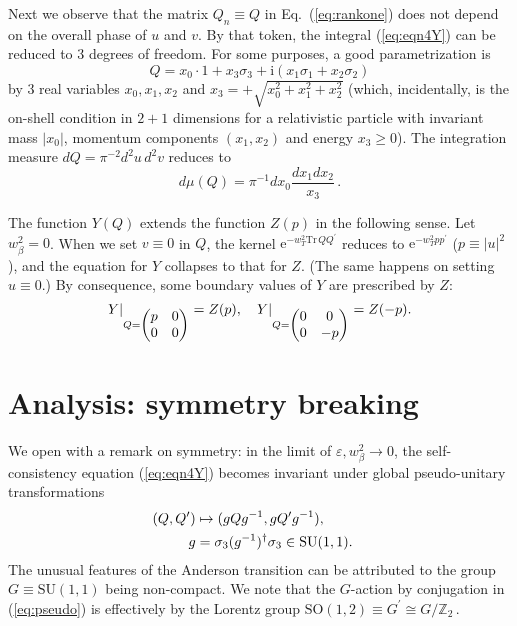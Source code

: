 \documentclass[aps,prl,twocolumn,letterpaper,superscriptaddress]{revtex4-2}
\begin{document}
Next we observe that the matrix $Q_n \equiv Q$ in Eq.\ (\ref{eq:rankone}) does not depend on the overall phase of $u$ and $v$. By that token, the integral (\ref{eq:eqn4Y}) can be reduced to 3 degrees of freedom. For some purposes, a good parametrization is
\begin{equation}\label{eq:Q-cart}
    Q = x_0 \cdot 1 + x_3 \sigma_3 + \mathrm{i}(x_1 \sigma_1 + x_2 \sigma_2)
\end{equation}
by 3 real variables $x_0, x_1, x_2$ and $x_3 = + \sqrt{x_0^2 + x_1^2 + x_2^2}$ (which, incidentally, is the on-shell condition in $2+1$ dimensions for a relativistic particle with invariant mass $|x_0|$, momentum components $(x_1, x_2)$ and energy $x_3 \geq 0$). The integration measure $dQ = \pi^{-2} d^2u \, d^2v$ reduces to
\begin{equation}
    d\mu(Q) = \pi^{-1} dx_0 \frac{dx_1 dx_2}{x_3} \,.
\end{equation}

The function $Y(Q)$ extends the function $Z(p)$ in the following sense. Let $w_\beta^2 = 0$. When we set $v \equiv 0$ in $Q$, the kernel $\mathrm{e}^{-w_T^2 \mathrm{Tr}\, Q Q^\prime}$ reduces to $\mathrm{e}^{-w_T^2 p p^\prime}$ ($p \equiv |u|^2$), and the equation for $Y$ collapses to that for $Z$. (The same happens on setting $u \equiv 0$.) By consequence, some boundary values of $Y$ are prescribed by $Z$:
\begin{equation}
    Y \vert_{Q = \begin{pmatrix} p &0\cr 0 &0 \end{pmatrix}} = Z(p) , \quad
    Y \vert_{Q = \begin{pmatrix} 0 &0\cr 0 &-p \end{pmatrix}} = Z(-p) .
\end{equation}

\section{Analysis: symmetry breaking}
We open with a remark on symmetry: in the limit of $\varepsilon, w_\beta^2 \to 0$, the self-consistency equation (\ref{eq:eqn4Y}) becomes invariant under global pseudo-unitary transformations
\begin{align}\label{eq:pseudo}
    (Q,Q^\prime) &\mapsto (g Q g^{-1}, g Q^\prime g^{-1}) , \cr g &= \sigma_3 (g^{-1})^\dagger \sigma_3 \in \mathrm{SU}(1,1) .
\end{align}
The unusual features of the Anderson transition can be attributed to the group $G \equiv \mathrm{SU}(1,1)$ being non-compact. We note that the $G$-action by conjugation in (\ref{eq:pseudo}) is effectively by the Lorentz group $\mathrm{SO}(1,2) \equiv G^\prime \cong G / \mathbb{Z}_2\,$.
\end{document}
